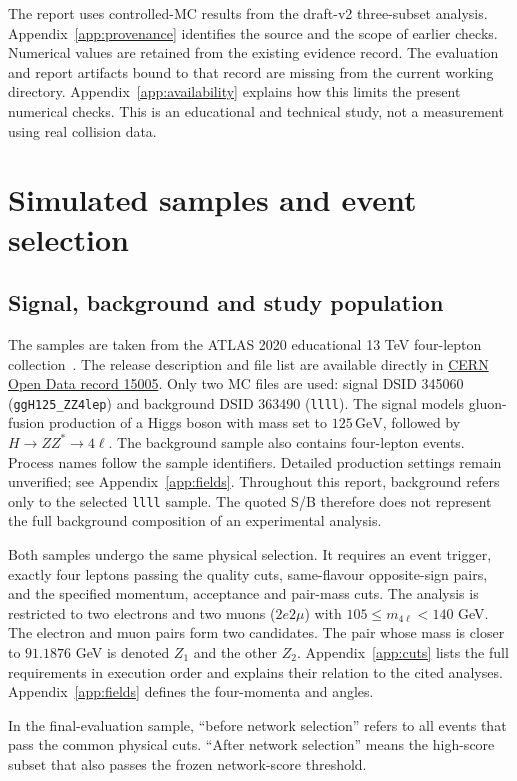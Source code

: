 \documentclass[11pt,a4paper]{article}
\newcommand{\gev}{\,\mathrm{GeV}}
\begin{document}
The report uses controlled-MC results from the draft-v2 three-subset analysis. Appendix~\ref{app:provenance} identifies the source and the scope of earlier checks.
Numerical values are retained from the existing evidence record. The evaluation and report artifacts bound to that record are missing from the current working directory. Appendix~\ref{app:availability} explains how this limits the present numerical checks.
This is an educational and technical study, not a measurement using real collision data.

\section{Simulated samples and event selection}

\subsection{Signal, background and study population}
The samples are taken from the ATLAS 2020 educational 13 TeV four-lepton collection~\cite{OpenData}.
The release description and file list are available directly in \href{https://opendata.cern.ch/record/15005}{CERN Open Data record 15005}.
Only two MC files are used: signal DSID 345060 (\texttt{ggH125\_ZZ4lep}) and background DSID 363490 (\texttt{llll}).
The signal models gluon-fusion production of a Higgs boson with mass set to $125\gev$, followed by $H\to ZZ^*\to4\ell$. The background sample also contains four-lepton events.
Process names follow the sample identifiers. Detailed production settings remain unverified; see Appendix~\ref{app:fields}.
Throughout this report, background refers only to the selected \texttt{llll} sample. The quoted S/B therefore does not represent the full background composition of an experimental analysis.

Both samples undergo the same physical selection. It requires an event trigger, exactly four leptons passing the quality cuts, same-flavour opposite-sign pairs, and the specified momentum, acceptance and pair-mass cuts.
The analysis is restricted to two electrons and two muons ($2e2\mu$) with $105\leq m_{4\ell}<140$ GeV.
The electron and muon pairs form two candidates. The pair whose mass is closer to $91.1876$ GeV is denoted $Z_1$ and the other $Z_2$.
Appendix~\ref{app:cuts} lists the full requirements in execution order and explains their relation to the cited analyses. Appendix~\ref{app:fields} defines the four-momenta and angles.

In the final-evaluation sample, ``before network selection'' refers to all events that pass the common physical cuts.
``After network selection'' means the high-score subset that also passes the frozen network-score threshold.
\end{document}
